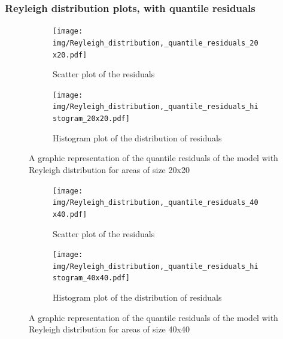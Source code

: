 \documentclass[12pt,a4paper,twoside]{article}
\begin{document}
\subsubsection{Reyleigh distribution plots, with quantile residuals}
\label{sssec:reyleighquantile}
\begin{figure}[!ht]
    \begin{subfigure}{.45\textwidth}
        \centering
        \texttt{[image: img/Reyleigh\_distribution,\_quantile\_residuals\_20x20.pdf]}
        \caption{Scatter plot of the residuals}
        \label{fig:reyleighquantilescatter20}
    \end{subfigure}
    \begin{subfigure}{.45\textwidth}
        \centering
        \texttt{[image: img/Reyleigh\_distribution,\_quantile\_residuals\_histogram\_20x20.pdf]}
        \caption{Histogram plot of the distribution of residuals}
        \label{fig:reyleighquantilehist20}
    \end{subfigure}
    \caption{A graphic representation of the quantile residuals of the model with Reyleigh
    distribution for areas of size 20x20}
    \label{fig:reyleighquantilefig20}
\end{figure}

\begin{figure}[!ht]
    \begin{subfigure}{.45\textwidth}
        \centering
        \texttt{[image: img/Reyleigh\_distribution,\_quantile\_residuals\_40x40.pdf]}
        \caption{Scatter plot of the residuals}
        \label{fig:reyleighquantilescatter40}
    \end{subfigure}
    \begin{subfigure}{.45\textwidth}
        \centering
        \texttt{[image: img/Reyleigh\_distribution,\_quantile\_residuals\_histogram\_40x40.pdf]}
        \caption{Histogram plot of the distribution of residuals}
        \label{fig:reyleighquantilehist40}
    \end{subfigure}
    \caption{A graphic representation of the quantile residuals of the model with Reyleigh
    distribution for areas of size 40x40}
    \label{fig:reyleighquantilefig40}
\end{figure}

\newpage
\end{document}
